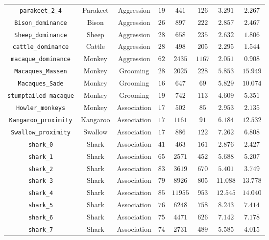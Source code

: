 \documentclass[twocolumn,8pt]{article}
\begin{document}
\begin{table}[p]
\begin{tabular}{c|ccccccc}
\verb|parakeet_2_4| & Parakeet & Aggression & $19$ & $441$ & $126$ & $3.291$ & $2.267$\\
\verb|Bison_dominance| & Bison & Aggression & $26$ & $897$ & $222$ & $2.857$ & $2.467$\\
\verb|Sheep_dominance| & Sheep & Aggression & $28$ & $658$ & $235$ & $2.632$ & $1.806$\\
\verb|cattle_dominance| & Cattle & Aggression & $28$ & $498$ & $205$ & $2.295$ & $1.544$\\
\verb|macaque_dominance| & Monkey & Aggression & $62$ & $2435$ & $1167$ & $2.051$ & $0.908$\\
\verb|Macaques_Massen| & Monkey & Grooming & $28$ & $2025$ & $228$ & $5.853$ & $15.949$\\
\verb|Macaques_Sade| & Monkey & Grooming & $16$ & $647$ & $69$ & $5.829$ & $10.074$\\
\verb|stumptailed_macaque| & Monkey & Grooming & $19$ & $742$ & $113$ & $4.609$ & $5.351$\\
\verb|Howler_monkeys| & Monkey & Association & $17$ & $502$ & $85$ & $2.953$ & $2.135$\\
\verb|Kangaroo_proximity| & Kangaroo & Association & $17$ & $1161$ & $91$ & $6.184$ & $12.532$\\
\verb|Swallow_proximity| & Swallow & Association & $17$ & $886$ & $122$ & $7.262$ & $6.808$\\
\verb|shark_0| & Shark & Association & $41$ & $463$ & $161$ & $2.876$ & $2.427$\\
\verb|shark_1| & Shark & Association & $65$ & $2571$ & $452$ & $5.688$ & $5.207$\\
\verb|shark_2| & Shark & Association & $83$ & $3619$ & $670$ & $5.401$ & $3.749$\\
\verb|shark_3| & Shark & Association & $79$ & $8926$ & $805$ & $11.088$ & $13.778$\\
\verb|shark_4| & Shark & Association & $85$ & $11955$ & $953$ & $12.545$ & $14.040$\\
\verb|shark_5| & Shark & Association & $76$ & $6248$ & $758$ & $8.243$ & $7.414$\\
\verb|shark_6| & Shark & Association & $75$ & $4471$ & $626$ & $7.142$ & $7.178$\\
\verb|shark_7| & Shark & Association & $74$ & $2731$ & $489$ & $5.585$ & $4.015$\\
\bottomrule 
\end{tabular} 
 
 
 \end{table} 
 
\end{document}
